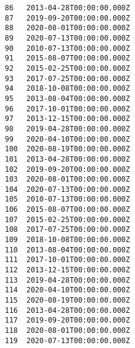 \documentclass[11pt]{article}
\begin{document}
\begin{tcolorbox}[breakable, size=fbox, boxrule=.5pt, pad at break*=1mm, opacityfill=0]
\begin{Verbatim}[commandchars=\\\{\}]
86   2013-04-28T00:00:00.000Z
87   2019-09-20T00:00:00.000Z
88   2020-08-01T00:00:00.000Z
89   2020-07-13T00:00:00.000Z
90   2010-07-13T00:00:00.000Z
91   2015-08-07T00:00:00.000Z
92   2015-02-25T00:00:00.000Z
93   2017-07-25T00:00:00.000Z
94   2018-10-08T00:00:00.000Z
95   2013-08-04T00:00:00.000Z
96   2017-10-01T00:00:00.000Z
97   2013-12-15T00:00:00.000Z
98   2019-04-28T00:00:00.000Z
99   2020-04-10T00:00:00.000Z
100  2020-08-19T00:00:00.000Z
101  2013-04-28T00:00:00.000Z
102  2019-09-20T00:00:00.000Z
103  2020-08-01T00:00:00.000Z
104  2020-07-13T00:00:00.000Z
105  2010-07-13T00:00:00.000Z
106  2015-08-07T00:00:00.000Z
107  2015-02-25T00:00:00.000Z
108  2017-07-25T00:00:00.000Z
109  2018-10-08T00:00:00.000Z
110  2013-08-04T00:00:00.000Z
111  2017-10-01T00:00:00.000Z
112  2013-12-15T00:00:00.000Z
113  2019-04-28T00:00:00.000Z
114  2020-04-10T00:00:00.000Z
115  2020-08-19T00:00:00.000Z
116  2013-04-28T00:00:00.000Z
117  2019-09-20T00:00:00.000Z
118  2020-08-01T00:00:00.000Z
119  2020-07-13T00:00:00.000Z


\end{Verbatim}
\end{tcolorbox}
\end{document}

